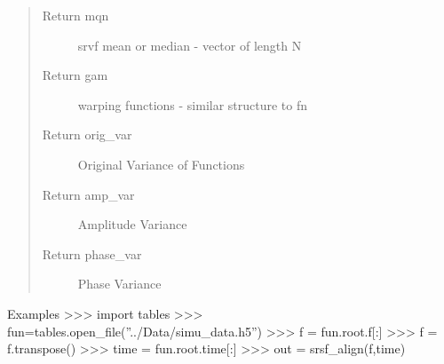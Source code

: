 \documentclass[letterpaper,10pt,english]{sphinxmanual}
\begin{document}
\begin{fulllineitems}
\begin{quote}
\begin{description}
\item[{Return mqn}] \leavevmode
srvf mean or median - vector of length N

\item[{Return gam}] \leavevmode
warping functions - similar structure to fn

\item[{Return orig\_var}] \leavevmode
Original Variance of Functions

\item[{Return amp\_var}] \leavevmode
Amplitude Variance

\item[{Return phase\_var}] \leavevmode
Phase Variance

\end{description}\end{quote}

Examples
\textgreater{}\textgreater{}\textgreater{} import tables
\textgreater{}\textgreater{}\textgreater{} fun=tables.open\_file(''../Data/simu\_data.h5'')
\textgreater{}\textgreater{}\textgreater{} f = fun.root.f{[}:{]}
\textgreater{}\textgreater{}\textgreater{} f = f.transpose()
\textgreater{}\textgreater{}\textgreater{} time = fun.root.time{[}:{]}
\textgreater{}\textgreater{}\textgreater{} out = srsf\_align(f,time)

\end{fulllineitems}

\end{document}
